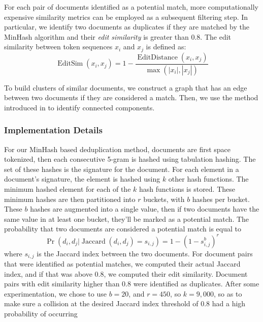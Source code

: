 For each pair of documents identified as a potential match, more computationally expensive similarity metrics can be employed as a subsequent filtering step.
In particular, we identify two documents as duplicates if they are matched by the MinHash algorithm and their \emph{edit similarity} is greater than 0.8. The edit similarity between token sequences $x_i$ and $x_j$ is defined as:
\begin{equation}
    \operatorname{EditSim}(x_i, x_j) = 1 - \frac{\operatorname{EditDistance}(x_i, x_j)}{\max(|x_i|, |x_j|)}
\end{equation}

\noindent To build clusters of similar documents, we construct a graph that has an edge between two documents if they are considered a match. Then, we use the method introduced in \citet{lacki2018connected} to identify  connected components.
%

\subsubsection{Implementation Details}
\label{section:minhash_details}
For our MinHash based deduplication method, documents are first space tokenized, then each consecutive 5-gram is hashed using tabulation hashing.
The set of these hashes is the signature for the document.
For each element in a document's signature, the element is hashed using $k$ other hash functions.
The minimum hashed element for each of the $k$ hash functions is stored.
These minimum hashes are then partitioned into $r$ buckets, with $b$ hashes per bucket.
These $b$ hashes are augmented into a single value, then if two documents have the same value in at least one bucket, they'll be marked as a potential match.
The probability that two documents are considered a potential match is equal to
\begin{equation}
\operatorname{Pr}(d_i, d_j | \operatorname{Jaccard}(d_i, d_j) = s_{i, j}) = 1 - (1 - s_{i, j}^b)^r
\end{equation}
where $s_{i,j}$ is the Jaccard index between the two documents.
For document pairs that were identified as potential matches, we computed their actual Jaccard index, and if that was above 0.8, we computed their edit similarity.
Document pairs with edit similarity higher than 0.8 were identified as duplicates.
After some experimentation, we chose to use $b=20$, and $r=450$, so $k=9,000$, so as to make sure a collision at the desired Jaccard index threshold of 0.8 had a high probability of occurring

